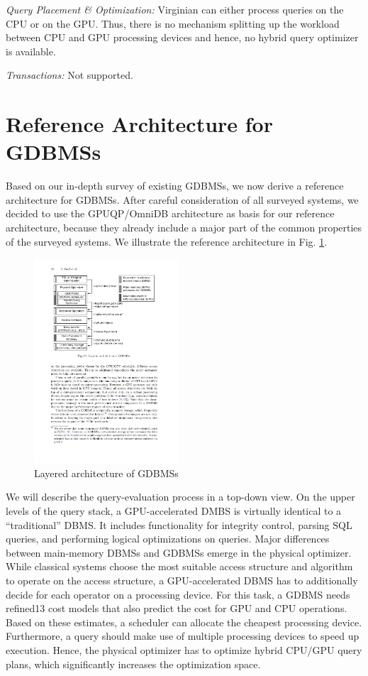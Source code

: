 \documentclass[twocolumn]{article}
\begin{document}
\noindent
\textit{Query Placement \& Optimization:} Virginian can either process queries on the CPU or on the GPU. Thus, there is no mechanism splitting up the workload between CPU and GPU processing devices and hence, no hybrid query optimizer is available.

\noindent
\textit{Transactions:} Not supported.


\section{Reference Architecture for GDBMSs}
Based on our in-depth survey of existing GDBMSs, we now derive a reference architecture for GDBMSs. After careful consideration of all surveyed systems, we decided to use the GPUQP/OmniDB architecture as basis for our reference architecture, because they already include a major part of the common properties of the surveyed systems. We illustrate the reference architecture in Fig. \ref{fig:gdbms}.
\begin{figure}[htb]
        \centering
        \includegraphics[width=0.48\textwidth]{gdbms.pdf}
        \caption{Layered architecture of GDBMSs}
        \label{fig:gdbms}
\end{figure}

We will describe the query-evaluation process in a top-down view. On the upper levels of the query stack, a GPU-accelerated DMBS is virtually identical to a “traditional” DBMS. It includes functionality for integrity control, parsing SQL queries, and performing logical optimizations on queries. Major differences between main-memory DBMSs and GDBMSs emerge in the physical optimizer. While classical systems choose the most suitable access structure and algorithm to operate on the access structure, a GPU-accelerated DBMS has to additionally decide for each operator on a processing device. For this task, a GDBMS needs refined13 cost models that also predict the cost for GPU and CPU operations. Based on these estimates, a scheduler can allocate the cheapest processing device. Furthermore, a query should make use of multiple processing devices to speed up execution. Hence, the physical optimizer has to optimize hybrid CPU/GPU query plans, which significantly increases the optimization space.
\end{document}
